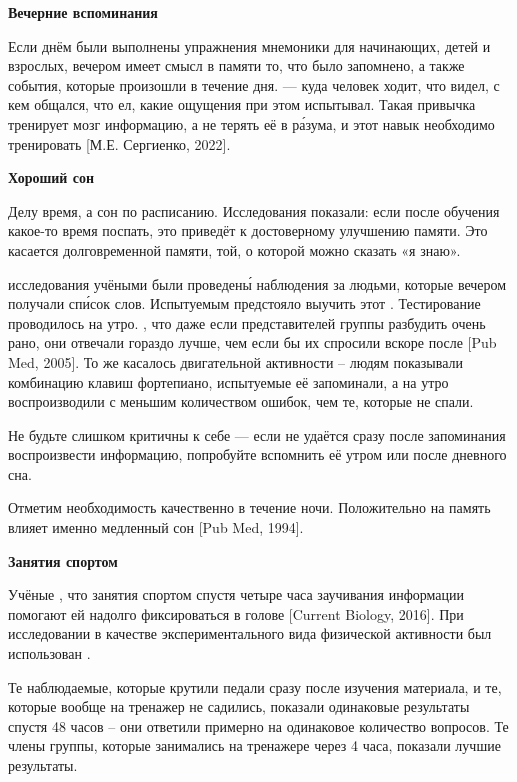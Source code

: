 \textbf{Вечерние вспоминания}

Если днём были выполнены упражнения мнемоники для начинающих, детей и взрослых, вечером имеет смысл  в памяти то, что было запомнено, а также события, которые произошли в течение дня.   --- куда человек ходит, что видел, с кем общался, что ел, какие ощущения при этом испытывал. Такая привычка тренирует мозг  информацию, а не терять её в  р\'{а}зума, и этот навык необходимо тренировать [М.Е. Сергиенко, 2022].

\textbf{Хороший сон}

Делу время, а сон по расписанию. Исследования показали: если после обучения какое-то время поспать, это приведёт к достоверному улучшению памяти. Это касается долговременной памяти, той, о которой можно сказать «я знаю».

 исследования учёными были проведен\'{ы} наблюдения за людьми, которые вечером получали сп\'{и}сок слов. Испытуемым предстояло выучить этот . Тестирование проводилось на утро. , что даже если представителей группы разбудить очень рано, они отвечали гораздо лучше, чем если бы их спросили вскоре после  [Pub Med, 2005]. То же касалось двигательной активности – людям показывали комбинацию клавиш фортепиано, испытуемые её запоминали, а на утро воспроизводили с меньшим количеством ошибок, чем те, которые не спали.

Не будьте слишком критичны к себе --- если не удаётся сразу после запоминания воспроизвести информацию, попробуйте вспомнить её утром или после дневного сна.

Отметим необходимость качественно  в течение ночи. Положительно на память влияет именно медленный сон [Pub Med, 1994].

\textbf{Занятия спортом}

Учёные , что занятия спортом спустя четыре часа заучивания информации помогают ей надолго фиксироваться в голове [Current Biology, 2016]. При исследовании в качестве экспериментального вида физической активности был использован .

Те наблюдаемые, которые крутили педали сразу после изучения материала, и те, которые вообще на тренажер не садились, показали одинаковые результаты спустя 48 часов – они ответили примерно на одинаковое количество вопросов. Те члены группы, которые занимались на тренажере через 4 часа, показали лучшие результаты.

